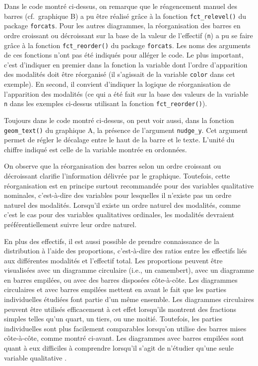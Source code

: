 \documentclass[
]{book}
\begin{document}
Dans le code montré ci-dessus, on remarque que le réagencement manuel des barres (cf.~graphique B) a pu être réalisé grâce à la fonction \texttt{fct\_relevel()} du package \texttt{forcats}. Pour les autres diagrammes, la réorganisation des barres en ordre croissant ou décroissant sur la base de la valeur de l'effectif (\texttt{n}) a pu se faire grâce à la fonction \texttt{fct\_reorder()} du package \texttt{forcats}. Les noms des arguments de ces fonctions n'ont pas été indiqués pour alléger le code. Le plus important, c'est d'indiquer en premier dans la fonction la variable dont l'ordre d'apparition des modalités doit être réorganisé (il s'agissait de la variable \texttt{color} dans cet exemple). En second, il convient d'indiquer la logique de réorganisation de l'apparition des modalités (ce qui a été fait sur la base des valeurs de la variable \texttt{n} dans les exemples ci-dessus utilisant la fonction \texttt{fct\_reorder()}).

Toujours dans le code montré ci-dessus, on peut voir aussi, dans la fonction \texttt{geom\_text()} du graphique A, la présence de l'argument \texttt{nudge\_y}. Cet argument permet de régler le décalage entre le haut de la barre et le texte. L'unité du chiffre indiqué est celle de la variable montrée en ordonnées.

On observe que la réorganisation des barres selon un ordre croissant ou décroissant clarifie l'information délivrée par le graphique. Toutefois, cette réorganisation est en principe surtout recommandée pour des variables qualitative nominales, c'est-à-dire des variables pour lesquelles il n'existe pas un ordre naturel des modalités. Lorsqu'il existe un ordre naturel des modalités, comme c'est le cas pour des variables qualitatives ordinales, les modalités devraient préférentiellement suivre leur ordre naturel.

En plus des effectifs, il est aussi possible de prendre connaissance de la distribution à l'aide des proportions, c'est-à-dire des ratios entre les effectifs liés aux différentes modalités et l'effectif total. Les proportions peuvent être visualisées avec un diagramme circulaire (i.e., un camembert), avec un diagramme en barres empilées, ou avec des barres disposées côte-à-côte. Les diagrammes circulaires et avec barres empilées mettent en avant le fait que les parties individuelles étudiées font partie d'un même ensemble. Les diagrammes circulaires peuvent être utilisés efficacement à cet effet lorsqu'ils montrent des fractions simples telles qu'un quart, un tiers, ou une moitié. Toutefois, les parties individuelles sont plus facilement comparables lorsqu'on utilise des barres mises côte-à-côte, comme montré ci-avant. Les diagrammes avec barres empilées sont quant à eux difficiles à comprendre lorsqu'il s'agit de n'étudier qu'une seule variable qualitative \autocite{wilkeFundamentalsDataVisualization2018}.
\end{document}
